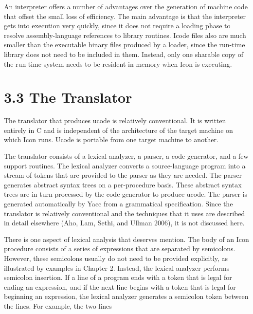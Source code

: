An interpreter offers a number of advantages over the generation of
machine code that offset the small loss of efficiency. The main
advantage is that the interpreter gets into execution very quickly,
since it does not require a loading phase to resolve assembly-language
references to library routines. Icode files also are much smaller than
the executable binary files produced by a loader, since the run-time
library does not need to be included in them. Instead, only one
sharable copy of the run-time system needs to be resident in memory
when Icon is executing.


\section[3.3 The Translator]{3.3 The Translator}

The translator that produces ucode is relatively conventional. It is
written entirely in C and is independent of the architecture of the
target machine on which Icon runs. Ucode is portable from one target
machine to another.

The translator consists of a lexical analyzer, a parser, a code
generator, and a few support routines. The lexical analyzer converts a
source-language program into a stream of tokens that are provided to
the parser as they are needed.  The parser generates abstract syntax
trees on a per-procedure basis. These abstract syntax trees are in
turn processed by the code generator to produce ucode. The parser is
generated automatically by Yacc from a grammatical specification.
Since the translator is relatively conventional and the techniques
that it uses are described in detail elsewhere (Aho, Lam, Sethi, and
Ullman 2006), it is not discussed here.

There is one aspect of lexical analysis that deserves mention. The
body of an Icon procedure consists of a series of expressions that are
separated by semicolons. However, these semicolons usually do not need
to be provided explicitly, as illustrated by examples in Chapter
2. Instead, the lexical analyzer performs semicolon insertion. If a
line of a program ends with a token that is legal for ending an
expression, and if the next line begins with a token that is legal for
beginning an expression, the lexical analyzer generates a semicolon
token between the lines. For example, the two lines


